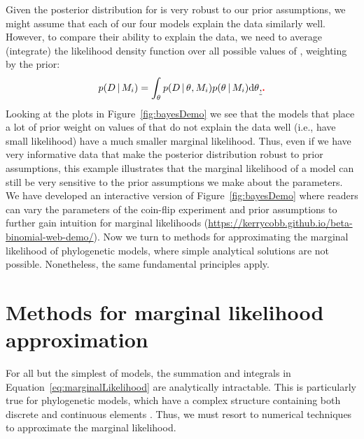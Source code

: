 \begin{linenomath}
Given the posterior distribution for \probheads is very robust to our prior
assumptions, we might assume that each of our four models explain the data
similarly well.
However, to compare their ability to explain the data, we need to
average (integrate) the likelihood density function over all possible
values of \probheads, weighting by the prior:
\begin{equation}
    p(\data \given \model[i]) =
    \int_{\probheads}
    p( \data \given \probheads, \model[i])
    p(\probheads \given \model[i])
    \diff{\probheads}\vmdel{,} \vmadd{.}
    \label{eq:coinMarginalLikelihood}
\end{equation}
Looking at the plots in Figure~\ref{fig:bayesDemo} we see that the models that
place a lot of prior weight on values of \probheads that do not explain the
data well (i.e., have small likelihood) have a much smaller marginal likelihood.
Thus, even if we have very informative data that make the posterior
distribution robust to prior assumptions, this example illustrates that the
marginal likelihood of a model can still be very sensitive to the prior
assumptions we make about the parameters.
We have developed an interactive version of Figure~\ref{fig:bayesDemo} where
readers can vary the parameters of the coin-flip experiment and prior
assumptions to further gain intuition for marginal likelihoods
(\href{https://kerrycobb.github.io/beta-binomial-web-demo/}{https://kerrycobb.github.io/beta-binomial-web-demo/}).
Now we turn to methods for approximating the marginal likelihood of
phylogenetic models, where simple analytical solutions are not possible.
Nonetheless, the same fundamental principles apply.
\end{linenomath}


\section{Methods for marginal likelihood approximation}

For all but the simplest of models, the summation and integrals in
Equation~\ref{eq:marginalLikelihood}
are analytically intractable.
This is particularly true for phylogenetic models, which have a complex
structure containing both discrete and continuous elements \citep{Kim2000}.
Thus, we must resort to numerical techniques to approximate the marginal
likelihood.

